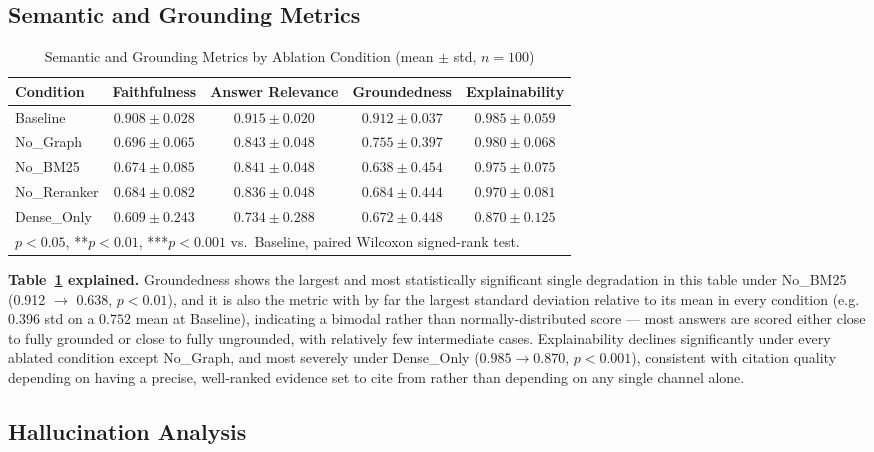\documentclass[conference]{IEEEtran}
\begin{document}
\subsection{Semantic and Grounding Metrics}

\begin{table}[t]
\centering
\caption{Semantic and Grounding Metrics by Ablation Condition (mean $\pm$ std, $n=100$)}
\label{tab:semantic}
\begin{tabular}{@{}lcccc@{}}
\toprule
\textbf{Condition} & \textbf{Faithfulness} & \textbf{Answer Relevance} & \textbf{Groundedness} & \textbf{Explainability} \\
\midrule
Baseline     & $0.908 \pm 0.028$ & $0.915 \pm 0.020$ & $0.912 \pm 0.037$ & $0.985 \pm 0.059$ \\
No\_Graph    & $0.696 \pm 0.065$ & $0.843 \pm 0.048$ & $0.755 \pm 0.397$ & $0.980 \pm 0.068$ \\
No\_BM25     & $0.674 \pm 0.085$\rlap{*} & $0.841 \pm 0.048$ & $0.638 \pm 0.454$\rlap{**} & $0.975 \pm 0.075$\rlap{*} \\
No\_Reranker & $0.684 \pm 0.082$ & $0.836 \pm 0.048$ & $0.684 \pm 0.444$ & $0.970 \pm 0.081$\rlap{*} \\
Dense\_Only  & $0.609 \pm 0.243$ & $0.734 \pm 0.288$ & $0.672 \pm 0.448$ & $0.870 \pm 0.125$\rlap{***} \\
\bottomrule
\multicolumn{5}{l}{\footnotesize *$p<0.05$, **$p<0.01$, ***$p<0.001$ vs.\ Baseline, paired Wilcoxon signed-rank test.}
\end{tabular}
\end{table}

\textbf{Table~\ref{tab:semantic} explained.} Groundedness shows the largest and most statistically significant single degradation in this table under No\_BM25 (0.912 $\rightarrow$ 0.638, $p<0.01$), and it is also the metric with by far the largest standard deviation relative to its mean in every condition (e.g. $0.396$ std on a $0.752$ mean at Baseline), indicating a bimodal rather than normally-distributed score --- most answers are scored either close to fully grounded or close to fully ungrounded, with relatively few intermediate cases. Explainability declines significantly under every ablated condition except No\_Graph, and most severely under Dense\_Only ($0.985 \rightarrow 0.870$, $p<0.001$), consistent with citation quality depending on having a precise, well-ranked evidence set to cite from rather than depending on any single channel alone.

\subsection{Hallucination Analysis}
\end{document}
